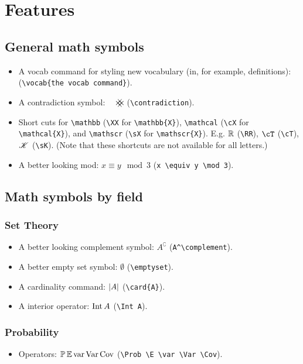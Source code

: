 \documentclass[10pt,letterpaper]{amsart}
\begin{document}
\section{Features}

\subsection{General math symbols}
\begin{itemize}
  \item A vocab command for styling new vocabulary (in, for example, definitions):  (\verb|\vocab{the vocab command}|). 
  \item A contradiction symbol: \(\contradiction\) (\verb|\contradiction|). 
  \item Short cuts for \verb|\mathbb| (\verb|\XX| for \verb|\mathbb{X}|), \verb|\mathcal| (\verb|\cX| for \verb|\mathcal{X}|), and \verb|\mathscr| (\verb|\sX| for \verb|\mathscr{X}|). E.g. \(\mathbb{R}\) (\verb|\RR|), \(\cT\) (\verb|\cT|), \(\mathscr{K}\) (\verb|\sK|). (Note that these shortcuts are not available for all letters.)
  
  \item A better looking mod: \(x \equiv y \mod 3\) (\verb|x \equiv y \mod 3|). 
\end{itemize}


\subsection{Math symbols by field}
\subsubsection*{Set Theory}
\begin{itemize}
  \item A better looking complement symbol: \(A^\complement\) (\verb|A^\complement|).
  \item A better empty set symbol: \(\emptyset\) (\verb|\emptyset|). 
  \item A cardinality command: \(\left|A\right|\) (\verb|\card{A}|). 
  \item A interior operator: \(\operatorname{Int} A\) (\verb|\Int A|). 
\end{itemize}

\subsubsection*{Probability}
\begin{itemize} 
  \item Operators: \(\operatorname{\mathbb{P}} \operatorname{\mathbb{E}} \operatorname{var} \operatorname{Var} \operatorname{Cov}\) (\verb|\Prob \E \var \Var \Cov|). 
\end{itemize}
\end{document}
